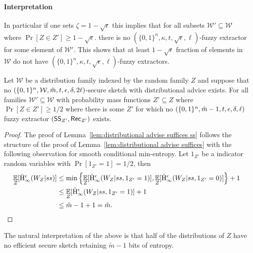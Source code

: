 \paragraph{Interpretation} 
In particular if one sets $\zeta = 1-\sqrt{\epsilon}$ this implies that for all subsets $\mathcal{W}' \subseteq \mathcal{W}$ where $\Pr[Z\in Z']\ge 1-\sqrt{\epsilon}.$ there is no $(\{0,1\}^n,\kappa, t, \sqrt{\epsilon}, \ell)$-fuzzy extractor for some element of $\mathcal{W}'$.  This shows that at least $1-\sqrt{\epsilon}$ fraction of elements in $\mathcal{W}$ do not have $(\{0,1\}^n,\kappa, t, \sqrt{\epsilon}, \ell)$-fuzzy extractors.

\begin{lemma}
Let $\mathcal{W}$ be a distribution family indexed by the random family $Z$ and suppose that no $(\{0, 1\}^n, \mathcal{W}, \tilde{m}, t, \epsilon, \delta, 2\ell)$-secure sketch with distributional advice exists.  For all families $\mathcal{W}'\subseteq \mathcal{W}$ with probability mass functions $Z'\subseteq Z$ where $\Pr[Z\in Z']\ge 1/2$ where 
there is some $Z'$ for which no  $(\{0, 1\}^n, \tilde{m}-1, t, \epsilon, \delta, \ell)$ fuzzy extractor $({\mathsf{SS}}_{Z'}, {\mathsf{Rec}}_{Z'})$  exists.
\label{lem:distributional advise suffices ss}
\end{lemma}

\begin{proof}
The proof of Lemma~\ref{lem:distributional advise suffices ss} follows the structure of the proof of Lemma~\ref{lem:distributional advise suffices} with the following observation for smooth conditional min-entropy.  Let $1_{Z'}$ be a indicator random variables with $\Pr[1_{Z'} = 1] =1/2$, then 
\begin{align*}
\operatorname*{\mathbb{E}}_{Z} [\tilde{\mathrm{H}}_\infty^\epsilon(W_Z| ss)] &\le \min\left\{\operatorname*{\mathbb{E}}_{Z} [\tilde{\mathrm{H}}_\infty^\epsilon(W_Z| ss, 1_{Z'} = 1)],\operatorname*{\mathbb{E}}_{Z} [\tilde{\mathrm{H}}_\infty^\epsilon(W_Z| ss, 1_{Z'} = 0)] \right\}+1\\
&\le \operatorname*{\mathbb{E}}_{Z} [\tilde{\mathrm{H}}_\infty^\epsilon(W_Z| ss, 1_{Z'} = 1)]+1\\
&\le \tilde{m}-1+1 = \tilde{m}.
\end{align*}
\end{proof}

The natural interpretation of the above is that half of the distributions of $Z$ have no efficient secure sketch retaining $\tilde{m}-1$ bits of entropy.

